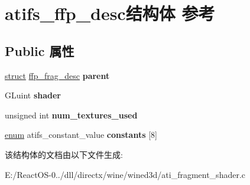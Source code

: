 \hypertarget{structatifs__ffp__desc}{}\section{atifs\+\_\+ffp\+\_\+desc结构体 参考}
\label{structatifs__ffp__desc}
\subsection*{Public 属性}
\begin{DoxyCompactItemize}
\item 
\mbox{\label{structatifs__ffp__desc_a9756c35e6c55b4e7e82894ceacd6991c}} 
\hyperlink{interfacestruct}{struct} \hyperlink{structffp__frag__desc}{ffp\+\_\+frag\+\_\+desc} {\bfseries parent}
\item 
\mbox{\label{structatifs__ffp__desc_acfb481458a308533f63a405d69cefbb2}} 
G\+Luint {\bfseries shader}
\item 
\mbox{\label{structatifs__ffp__desc_a044286c8814769ff4b7284fad696bf9d}} 
unsigned int {\bfseries num\+\_\+textures\+\_\+used}
\item 
\mbox{\label{structatifs__ffp__desc_a538b515e3a2d65043242ad79218002d4}} 
\hyperlink{interfaceenum}{enum} atifs\+\_\+constant\+\_\+value {\bfseries constants} \mbox{[}8\mbox{]}
\end{DoxyCompactItemize}


该结构体的文档由以下文件生成\+:\begin{DoxyCompactItemize}
\item 
E\+:/\+React\+O\+S-\/0../dll/directx/wine/wined3d/ati\+\_\+fragment\+\_\+shader.\+c\end{DoxyCompactItemize}
